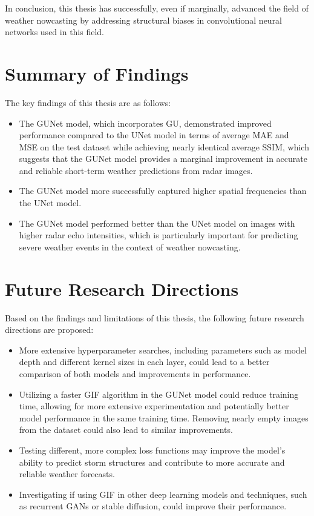 In conclusion, this thesis has successfully, even if marginally, advanced the field of weather nowcasting by addressing structural biases in convolutional neural networks used in this field.


\section{Summary of Findings}

The key findings of this thesis are as follows:
\label{sec:summary_findings}

\begin{itemize}
    \item The \gls{GUNet} model, which incorporates \gls{GU}, demonstrated improved performance compared to the UNet model in terms of average \gls{MAE} and \gls{MSE} on the test dataset while achieving nearly identical average \gls{SSIM}, which suggests that the \gls{GUNet} model provides a marginal improvement in accurate and reliable short-term weather predictions from radar images.
    \item The \gls{GUNet} model more successfully captured higher spatial frequencies than the UNet model.
    \item The \gls{GUNet} model performed better than the UNet model on images with higher radar echo intensities, which is particularly important for predicting severe weather events in the context of weather nowcasting.
\end{itemize}

\section{Future Research Directions}
\label{sec:future_research}

Based on the findings and limitations of this thesis, the following future research directions are proposed:
\begin{itemize}
    \item More extensive hyperparameter searches, including parameters such as model depth and different kernel sizes in each layer, could lead to a better comparison of both models and improvements in performance.

    \item Utilizing a faster \gls{GIF} algorithm in the GUNet model could reduce training time, allowing for more extensive experimentation and potentially better model performance in the same training time. Removing nearly empty images from the dataset could also lead to similar improvements.

    \item Testing different, more complex loss functions may improve the model's ability to predict storm structures and contribute to more accurate and reliable weather forecasts.

    \item Investigating if using \gls{GIF} in other deep learning models and techniques, such as recurrent \glspl{GAN} or stable diffusion, could improve their performance.

\end{itemize}